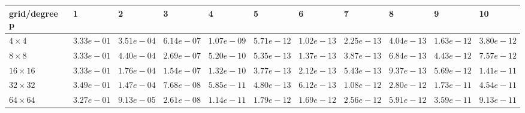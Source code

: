 \begin{tabular}{lllllllllll}
\hline
 grid/degree p   & 1          & 2          & 3          & 4          & 5          & 6          & 7          & 8          & 9          & 10         \\
\hline
 $4 \times 4$    & $3.33e-01$ & $3.51e-04$ & $6.14e-07$ & $1.07e-09$ & $5.71e-12$ & $1.02e-13$ & $2.25e-13$ & $4.04e-13$ & $1.63e-12$ & $3.80e-12$ \\
 $8 \times 8$    & $3.33e-01$ & $4.40e-04$ & $2.69e-07$ & $5.20e-10$ & $5.35e-13$ & $1.37e-13$ & $3.87e-13$ & $6.84e-13$ & $4.43e-12$ & $7.57e-12$ \\
 $16 \times 16$  & $3.33e-01$ & $1.76e-04$ & $1.54e-07$ & $1.32e-10$ & $3.77e-13$ & $2.12e-13$ & $5.43e-13$ & $9.37e-13$ & $5.69e-12$ & $1.41e-11$ \\
 $32 \times 32$  & $3.49e-01$ & $1.47e-04$ & $7.68e-08$ & $5.85e-11$ & $4.80e-13$ & $6.12e-13$ & $1.08e-12$ & $2.80e-12$ & $1.73e-11$ & $4.54e-11$ \\
 $64 \times 64$  & $3.27e-01$ & $9.13e-05$ & $2.61e-08$ & $1.14e-11$ & $1.79e-12$ & $1.69e-12$ & $2.56e-12$ & $5.91e-12$ & $3.59e-11$ & $9.13e-11$ \\
\hline
\end{tabular}